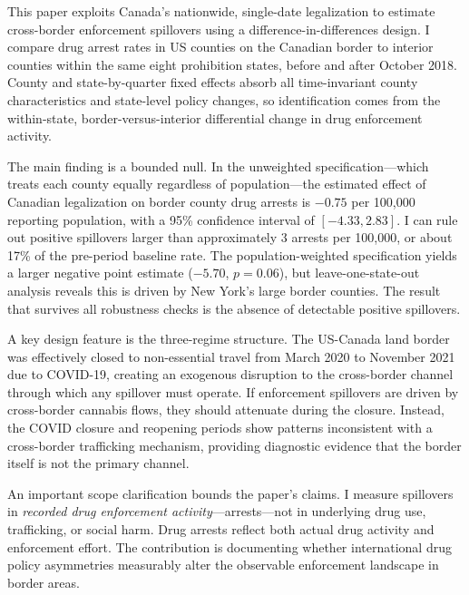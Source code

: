 \documentclass[12pt]{article}
\begin{document}
This paper exploits Canada's nationwide, single-date legalization to estimate cross-border enforcement spillovers using a difference-in-differences design. I compare drug arrest rates in US counties on the Canadian border to interior counties within the same eight prohibition states, before and after October 2018. County and state-by-quarter fixed effects absorb all time-invariant county characteristics and state-level policy changes, so identification comes from the within-state, border-versus-interior differential change in drug enforcement activity.

The main finding is a bounded null. In the unweighted specification---which treats each county equally regardless of population---the estimated effect of Canadian legalization on border county drug arrests is $-0.75$ per 100,000 reporting population, with a 95\% confidence interval of $[-4.33, 2.83]$. I can rule out positive spillovers larger than approximately 3 arrests per 100,000, or about 17\% of the pre-period baseline rate. The population-weighted specification yields a larger negative point estimate ($-5.70$, $p = 0.06$), but leave-one-state-out analysis reveals this is driven by New York's large border counties. The result that survives all robustness checks is the absence of detectable positive spillovers.

A key design feature is the three-regime structure. The US-Canada land border was effectively closed to non-essential travel from March 2020 to November 2021 due to COVID-19, creating an exogenous disruption to the cross-border channel through which any spillover must operate. If enforcement spillovers are driven by cross-border cannabis flows, they should attenuate during the closure. Instead, the COVID closure and reopening periods show patterns inconsistent with a cross-border trafficking mechanism, providing diagnostic evidence that the border itself is not the primary channel.

An important scope clarification bounds the paper's claims. I measure spillovers in \textit{recorded drug enforcement activity}---arrests---not in underlying drug use, trafficking, or social harm. Drug arrests reflect both actual drug activity and enforcement effort. The contribution is documenting whether international drug policy asymmetries measurably alter the observable enforcement landscape in border areas.
\end{document}
